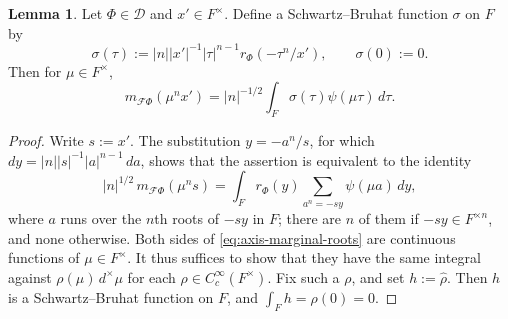 \documentclass[reqno]{amsart}
\theoremstyle{plain}
\theoremstyle{definition}
\theoremstyle{itplain}
\newtheorem{lemma}[theorem]{Lemma}
\numberwithin{equation}{section}
\numberwithin{theorem}{section}
\begin{document}
\begin{lemma}\label{lemma:axis-marginal}
  Let $\Phi \in \mathcal{D}$ and $x' \in F^\times$.  Define a Schwartz--Bruhat function $\sigma$ on $F$ by
  \begin{equation*}
    \sigma(\tau) := \lvert n \rvert \lvert x' \rvert^{-1} \lvert \tau \rvert^{n-1} r_\Phi(- \tau^n / x'),
    \qquad \sigma(0) := 0.
  \end{equation*}
  Then for $\mu \in F^\times$,
  \begin{equation*}
    m_{\mathcal{F} \Phi}(\mu^n x') = \lvert n \rvert^{-1/2} \int_F \sigma(\tau) \psi(\mu \tau) \, d \tau.
  \end{equation*}
\end{lemma}
\begin{proof}
  Write $s := x'$.  The substitution $y = - a^n / s$, for which $d y = \lvert n \rvert \lvert s \rvert^{-1} \lvert a \rvert^{n-1} \, d a$, shows that the assertion is equivalent to the identity
  \begin{equation}\label{eq:axis-marginal-roots}
    \lvert n \rvert^{1/2} \, m_{\mathcal{F} \Phi}(\mu^n s) = \int_F r_\Phi(y) \sum_{a^n = - s y} \psi(\mu a) \, d y,
  \end{equation}
  where $a$ runs over the $n$th roots of $- s y$ in $F$; there are $n$ of them if $- s y \in F^{\times n}$, and none otherwise.  Both sides of \eqref{eq:axis-marginal-roots} are continuous functions of $\mu \in F^\times$.  It thus suffices to show that they have the same integral against $\rho(\mu) \, d^\times \mu$ for each $\rho \in C_c^\infty(F^\times)$.  Fix such a $\rho$, and set $h := \hat{\rho}$.  Then $h$ is a Schwartz--Bruhat function on $F$, and $\int_F h = \rho(0) = 0$.


\end{proof}
\end{document}
